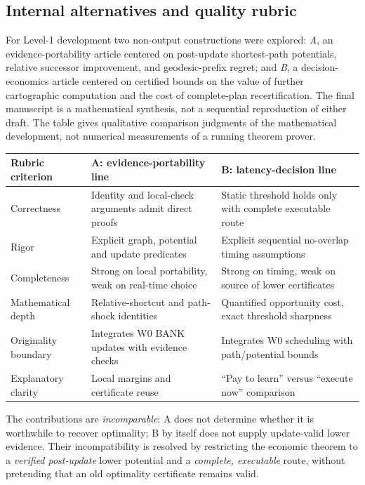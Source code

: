 \documentclass[11pt]{article}
\theoremstyle{definition}\newtheorem{definition}[theorem]{Definition}\newtheorem{assumption}[theorem]{Assumption}
\theoremstyle{remark}\newtheorem{remark}[theorem]{Remark}
\begin{document}
\subsection*{Internal alternatives and quality rubric}
For Level-1 development two non-output constructions were explored: \emph{A}, an evidence-portability article centered on post-update shortest-path potentials, relative successor improvement, and geodesic-prefix regret; and \emph{B}, a decision-economics article centered on certified bounds on the value of further cartographic computation and the cost of complete-plan recertification. The final manuscript is a mathematical synthesis, not a sequential reproduction of either draft. The table gives qualitative comparison judgments of the mathematical development, not numerical measurements of a running theorem prover.
\begin{center}\small
\begin{tabularx}{\linewidth}{@{}p{.22\linewidth}X X@{}}\toprule
Rubric criterion & A: evidence-portability line & B: latency-decision line\\\midrule
Correctness & Identity and local-check arguments admit direct proofs & Static threshold holds only with complete executable route\\
Rigor & Explicit graph, potential and update predicates & Explicit sequential no-overlap timing assumptions\\
Completeness & Strong on local portability, weak on real-time choice & Strong on timing, weak on source of lower certificates\\
Mathematical depth & Relative-shortcut and path-shock identities & Quantified opportunity cost, exact threshold sharpness\\
Originality boundary & Integrates W0 BANK updates with evidence checks & Integrates W0 scheduling with path/potential bounds\\
Explanatory clarity & Local margins and certificate reuse & ``Pay to learn'' versus ``execute now'' comparison\\\bottomrule
\end{tabularx}
\end{center}
The contributions are \emph{incomparable}: A does not determine whether it is worthwhile to recover optimality; B by itself does not supply update-valid lower evidence. Their incompatibility is resolved by restricting the economic theorem to a \emph{verified post-update} lower potential and a \emph{complete, executable} route, without pretending that an old optimality certificate remains valid.
\end{document}
